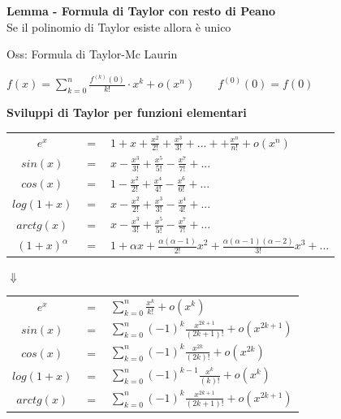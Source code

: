 \documentclass[12pt, a4paper]{article}
\begin{document}
    \textbf{Lemma - Formula di Taylor con resto di Peano}\\Se il polinomio di Taylor esiste allora è unico

    Oss: Formula di Taylor-Mc Laurin
    \begin{center}
        $f(x)=\sum_{k=0}^{n}\frac{f^{(k)}(0)}{k!}\cdot x^{k}+o(x^{n})\qquad f^{(0)}(0)=f(0)$
    \end{center}

    \textbf{Sviluppi di Taylor per funzioni elementari}
    \begin{center}
        \begin{tabular}{c c l}
            $e^{x}$          & $=$ & $1+x+\frac{x^{2}}{2!}+\frac{x^{3}}{3!}+...++\frac{x^{n}}{n!}+o(x^{n})$ \\
            $sin(x)$         & $=$ & $x-\frac{x^{3}}{3!}+\frac{x^{5}}{5!}-\frac{x^{7}}{7!}+...$             \\
            $cos(x)$         & $=$ & $1-\frac{x^{2}}{2!}+\frac{x^{4}}{4!}-\frac{x^{6}}{6!}+...$             \\
            $log(1+x)$       & $=$ & $x-\frac{x^{2}}{2!}+\frac{x^{3}}{3!}-\frac{x^{4}}{4!}+...$             \\
            $arctg(x)$       & $=$ & $x-\frac{x^{3}}{3!}+\frac{x^{5}}{5!}-\frac{x^{7}}{7!}+...$             \\
            $(1+x)^{\alpha}$ & $=$ & $1+\alpha x+\frac{\alpha(\alpha-1)}{2!}x^{2}+\frac{\alpha
            (\alpha-1)(\alpha-2)}{3!}x^{3}+...$                                                             \\
        \end{tabular}

        $\Downarrow$

        \begin{tabular}{c c l}
            $e^{x}$    & $=$ & $\sum^{n}_{k=0}\frac{x^{k}}{k!}+o(x^{k})$                    \\
            $sin(x)$   & $=$ & $\sum^{n}_{k=0}(-1)^{k}\frac{x^{2k+1}}{(2k+1)!}+o(x^{2k+1})$ \\
            $cos(x)$   & $=$ & $\sum^{n}_{k=0}(-1)^{k}\frac{x^{2k}}{(2k)!}+o(x^{2k})$       \\
            $log(1+x)$ & $=$ & $\sum^{n}_{k=0}(-1)^{k-1}\frac{x^{k}}{(k)!}+o(x^{k})$        \\
            $arctg(x)$ & $=$ & $\sum^{n}_{k=0}(-1)^{k}\frac{x^{2k+1}}{(2k+1)!}+o(x^{2k+1})$ \\
        \end{tabular}
    \end{center}
\end{document}
